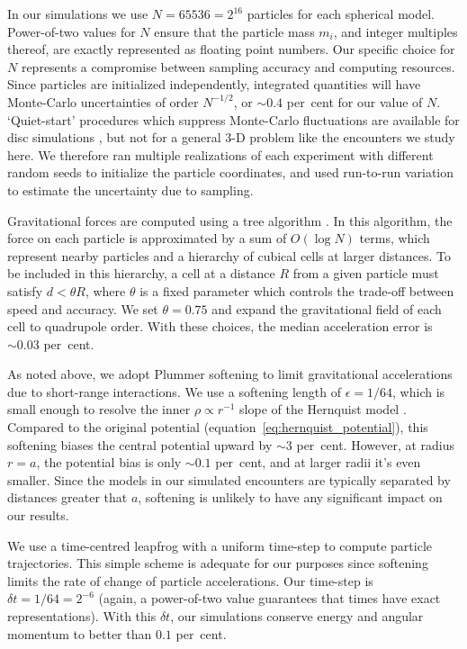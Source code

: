 \documentclass[fleqn,usenatbib]{mnras}
\begin{document}
In our simulations we use $N = 65536 = 2^{16}$ particles for each spherical model. Power-of-two values for $N$ ensure that the particle mass $m_i$, and integer multiples thereof, are exactly represented as floating point numbers. Our specific choice for $N$ represents a compromise between sampling accuracy and computing resources. Since particles are initialized independently, integrated quantities will have Monte-Carlo uncertainties of order $N^{-1/2}$, or $\sim 0.4$ per~cent for our value of $N$. `Quiet-start' procedures which suppress Monte-Carlo fluctuations are available for disc simulations \citep[e.g.,][]{DS2000}, but not for a general $3$-D problem like the encounters we study here. We therefore ran multiple realizations of each experiment with different random seeds to initialize the particle coordinates, and used run-to-run variation to estimate the uncertainty due to sampling.

Gravitational forces are computed using a tree algorithm \citep{BH1986}. In this algorithm, the force on each particle is approximated by a sum of $O(\log N)$ terms, which represent nearby particles and a hierarchy of cubical cells at larger distances. To be included in this hierarchy, a cell at a distance $R$ from a given particle must satisfy $d < \theta R$, where $\theta$ is a fixed parameter which controls the trade-off between speed and accuracy. We set $\theta = 0.75$ and expand the gravitational field of each cell to quadrupole order. With these choices, the median acceleration error is $\sim 0.03$ per~cent.

As noted above, we adopt Plummer softening to limit gravitational accelerations due to short-range interactions. We use a softening length of $\epsilon = 1/64$, which is small enough to resolve the inner $\rho \propto r^{-1}$ slope of the Hernquist model \citep{Barnes2012}. Compared to the original potential (equation~\ref{eq:hernquist_potential}), this softening biases the central potential upward by $\sim 3$ per~cent. However, at radius $r = a$, the potential bias is only $\sim 0.1$ per~cent, and at larger radii it's even smaller. Since the models in our simulated encounters are typically separated by distances greater that $a$, softening is unlikely to have any significant impact on our results.

We use a time-centred leapfrog with a uniform time-step to compute particle trajectories. This simple scheme is adequate for our purposes since softening limits the rate of change of particle accelerations. Our time-step is $\delta t = 1/64 = 2^{-6}$ (again, a power-of-two value guarantees that times have exact representations). With this $\delta t$, our simulations conserve energy and angular momentum to better than $0.1$ per~cent.
\end{document}
